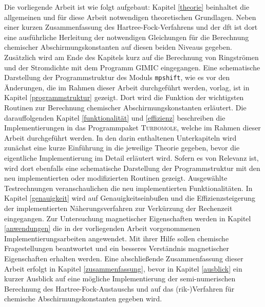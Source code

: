 \bigskip
Die vorliegende Arbeit ist wie folgt aufgebaut: Kapitel \ref{theorie} beinhaltet die allgemeinen und für diese Arbeit notwendigen theoretischen Grundlagen. Neben einer kurzen Zusammenfassung des Hartree-Fock-Verfahrens und der \acl{dft} ist dort eine ausführliche Herleitung der notwendigen Gleichungen für die Berechnung chemischer Abschirmungskonstanten auf diesen beiden Niveaus gegeben. Zusätzlich wird am Ende des Kapitels kurz auf die Berechnung von Ringströmen und der Stromdichte mit dem Programm GIMIC eingegangen. Eine schematische Darstellung der Programmstruktur des Moduls \texttt{mpshift}, wie es vor den Änderungen, die im Rahmen dieser Arbeit durchgeführt werden, vorlag, ist in Kapitel \ref{programmstruktur} gezeigt. Dort wird die Funktion der wichtigsten Routinen zur Berechnung chemischer Abschirmungskonstanten erläutert. Die darauffolgenden Kapitel \ref{funktionalität} und \ref{effizienz} beschreiben die Implementierungen in das Programmpaket \textsc{Turbomole}, welche im Rahmen dieser Arbeit durchgeführt werden. In den darin enthaltenen Unterkapiteln wird zunächst eine kurze Einführung in die jeweilige Theorie gegeben, bevor die eigentliche Implementierung im Detail erläutert wird. Sofern es von Relevanz ist, wird dort ebenfalls eine schematische Darstellung der Programmstruktur mit den neu implementierten oder modifizierten Routinen gezeigt. Ausgewählte Testrechnungen veranschaulichen die neu implementierten Funktionalitäten. In Kapitel \ref{genauigkeit} wird auf Genauigkeitseinbußen und die Effizienzsteigerung der implementierten Näherungsverfahren zur Verkürzung der Rechenzeit eingegangen. Zur Untersuchung magnetischer Eigenschaften werden in Kapitel \ref{anwendungen} die in der vorliegenden Arbeit vorgenommenen Implementierungsarbeiten angewendet. Mit ihrer Hilfe sollen chemische Fragestellungen beantwortet und ein besseres Verständnis magnetischer Eigenschaften erhalten werden. Eine abschließende Zusammenfassung dieser Arbeit erfolgt in Kapitel \ref{zusammenfassung}, bevor in Kapitel \ref{ausblick} ein kurzer Ausblick auf eine mögliche Implementierung der semi-numerischen Berechnung des Hartree-Fock-Austauschs und auf das \mbox{(\acs{rik}-)}Verfahren\supercite{weigend2002fully} für chemische Abschirmungskonstanten gegeben wird.